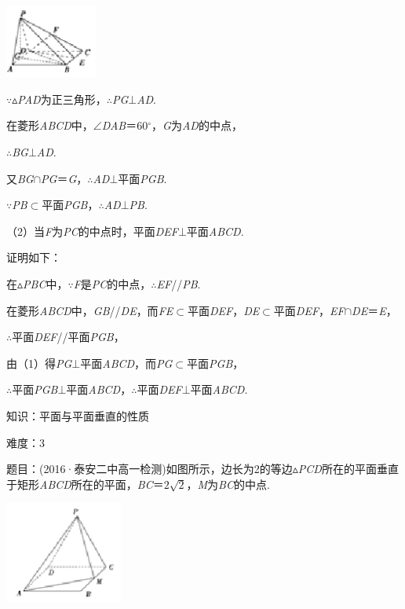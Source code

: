 \documentclass{article} %
\begin{document}
\includegraphics*[width=1.20in, height=0.94in, keepaspectratio=false]{image261}

$\mathrm{\because}$$\mathrm{\vartriangle}$\textit{PAD}为正三角形，$\mathrm{\therefore}$\textit{PG}$\mathrm{\bot}$\textit{AD}.

在菱形\textit{ABCD}中，$\mathrm{\angle}$\textit{DAB}＝60$\mathrm{{}^\circ}$，\textit{G}为\textit{AD}的中点，

$\mathrm{\therefore}$\textit{BG}$\mathrm{\bot}$\textit{AD}.

又\textit{BG}$\mathrm{\cap}$\textit{PG}＝\textit{G}，$\mathrm{\therefore}$\textit{AD}$\mathrm{\bot}$平面\textit{PGB}.

$\mathrm{\because}$\textit{PB}$\mathrm{\subset }$平面\textit{PGB}，$\mathrm{\therefore}$\textit{AD}$\mathrm{\bot}$\textit{PB}.

（2）当\textit{F}为\textit{PC}的中点时，平面\textit{DEF}$\mathrm{\bot}$平面\textit{ABCD}.

证明如下：

在$\mathrm{\vartriangle}$\textit{PBC}中，$\mathrm{\because}$\textit{F}是\textit{PC}的中点，$\mathrm{\therefore}$\textit{EF}//\textit{PB}.

在菱形\textit{ABCD}中，\textit{GB}//\textit{DE}，而\textit{FE}$\mathrm{\subset }$平面\textit{DEF}，\textit{DE}$\mathrm{\subset }$平面\textit{DEF}，\textit{EF}$\mathrm{\cap}$\textit{DE}＝\textit{E}，

$\mathrm{\therefore}$平面\textit{DEF}//平面\textit{PGB}，

由（1）得\textit{PG}$\mathrm{\bot}$平面\textit{ABCD}，而\textit{PG}$\mathrm{\subset }$平面\textit{PGB}，

$\mathrm{\therefore}$平面\textit{PGB}$\mathrm{\bot}$平面\textit{ABCD}，$\mathrm{\therefore}$平面\textit{DEF}$\mathrm{\bot}$平面\textit{ABCD}.

知识：平面与平面垂直的性质

难度：3

题目：(2016·泰安二中高一检测)如图所示，边长为2的等边$\mathrm{\vartriangle}$\textit{PCD}所在的平面垂直于矩形\textit{ABCD}所在的平面，\textit{BC}＝$2\sqrt{2}$，\textit{M}为\textit{BC}的中点.

\includegraphics*[width=1.52in, height=1.32in, keepaspectratio=false]{image262}
\end{document}
